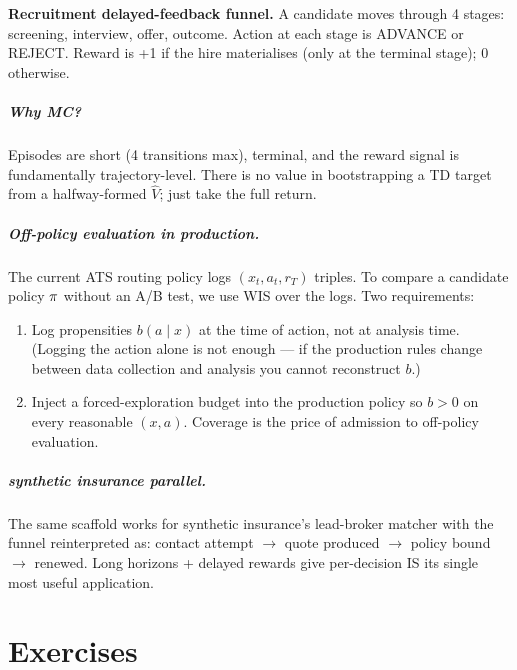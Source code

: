\documentclass[11pt,oneside]{scrbook}
\begin{document}
\begin{matching}
\textbf{Recruitment delayed-feedback funnel.}
A candidate moves through 4 stages: screening, interview, offer, outcome.
Action at each stage is ADVANCE or REJECT. Reward is +1 if the hire
materialises (only at the terminal stage); 0 otherwise.

\paragraph{Why MC?} Episodes are short (4 transitions max), terminal, and the
reward signal is fundamentally trajectory-level. There is no value in
bootstrapping a TD target from a halfway-formed $\hat V$; just take the full
return.

\paragraph{Off-policy evaluation in production.} The current ATS routing
policy logs $(x_t, a_t, r_T)$ triples. To compare a candidate policy $\pi$
without an A/B test, we use WIS over the logs. Two requirements:
\begin{enumerate}\setlength\itemsep{1pt}
  \item Log propensities $b(a\mid x)$ at the time of action, not at
        analysis time. (Logging the action alone is not enough --- if the
        production rules change between data collection and analysis you
        cannot reconstruct $b$.)
  \item Inject a forced-exploration budget into the production policy so
        $b > 0$ on every reasonable $(x, a)$. Coverage is the price of
        admission to off-policy evaluation.
\end{enumerate}

\paragraph{synthetic insurance parallel.} The same scaffold works for synthetic insurance's
lead-broker matcher with the funnel reinterpreted as: contact attempt $\to$
quote produced $\to$ policy bound $\to$ renewed. Long horizons + delayed
rewards give per-decision IS its single most useful application.
\end{matching}

\chapter{Exercises}
\end{document}
